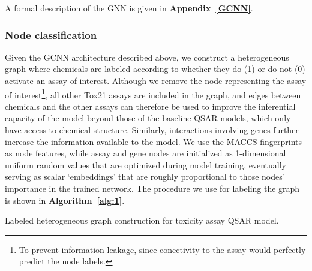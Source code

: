 \documentclass{ws-procs11x85}
\begin{document}
A formal description of the GNN is given in \textbf{Appendix~\ref{GCNN}}.

\subsubsection{Node classification}\label{methods-nc}
Given the GCNN architecture described above, we construct a heterogeneous graph where chemicals are labeled according to whether they do (1) or do not (0) activate an assay of interest.
Although we remove the node representing the assay of interest\footnote{To prevent information leakage, since conectivity to the assay would perfectly predict the node labels.}, all other Tox21 assays are included in the graph, and edges between chemicals and the other assays can therefore be used to improve the inferential capacity of the model beyond those of the baseline QSAR models, which only have access to chemical structure.
Similarly, interactions involving genes further increase the information available to the model.
We use the MACCS fingerprints as node features, while assay and gene nodes are initialized as 1-dimensional uniform random values that are optimized during model training, eventually serving as scalar `embeddings' that are roughly proportional to those nodes' importance in the trained network.
The procedure we use for labeling the graph is shown in \textbf{Algorithm~\ref{alg:1}}.

\begin{algorithm}
\caption{Labeled heterogeneous graph construction for toxicity assay QSAR model.}\label{alg:1}
\begin{algorithmic}
   \Else
   \EndIf
\EndFor
{}
\end{algorithmic}
\end{algorithm}
\end{document}
